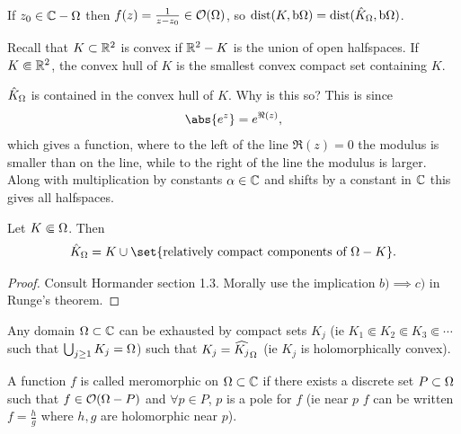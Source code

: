 \begin{remark}
    If $z_0 \in \mathbb{C} - \Omega$ then $f(z) = \frac{1}{z-z_0} \in \mathcal{O}(\Omega)$, so $\operatorname{dist}(K , \operatorname{b}\! \Omega)  = \operatorname{dist}(\hat{K}_\Omega , \operatorname{b}\! \Omega)$.
\end{remark}
\begin{remark}
    Recall that $K \subset \mathbb{R}^2$ is convex if $\mathbb{R}^2 - K$ is the union of open halfspaces. If $K \Subset \mathbb{R}^2$, the convex hull of $K$ is the smallest convex compact set containing $K$.
\end{remark}
\begin{remark}
    $\hat{K}_{\Omega}  $ is contained in the convex hull of $K$. Why is this so? This is since 
    \begin{align*}
        \abs{e^{z}} = e^{\Re(z)},
    \end{align*}
    which gives a function, where to the left of the line $\Re(z) = 0$ the modulus is smaller than on the line, while to the right of the line the modulus is larger. Along with multiplication by constants $\alpha \in \mathbb{C}$ and shifts by a constant in $\mathbb{C}$ this gives all halfspaces.
\end{remark}

\begin{theorem}
    Let $K \Subset \Omega$. Then
    \begin{align*}
        \hat{K}_\om = K \cup \set{\text{relatively compact components of } \om - K}.
    \end{align*}
\end{theorem}

\begin{proof}
    Consult Hormander section 1.3. Morally use the implication $b) \implies c)$ in Runge's theorem.
\end{proof}

\begin{corollary}
    Any domain $\Omega \subset \mathbb{C}$ can be exhausted by compact sets $K_j$ (ie $K_1 \Subset K_2 \Subset K_3 \Subset \cdots$ such that $\bigcup_{j \geq 1} K_j = \Omega$) such that $K_j = \widehat{K_j}_\Omega$ (ie $K_j$ is holomorphically convex).
\end{corollary}

\begin{definition}
    A function $f$ is called meromorphic on $\Omega \subset \mathbb{C}$ if there exists a discrete set $P \subset \Omega$ such that $f \in \mathcal{O} (\Omega - P)$ and $\forall p \in P$, $p$ is a pole for $f$ (ie near $p$ $f$ can be written $f = \frac{h}{g}$ where $h,g$ are holomorphic near $p$).
\end{definition}

